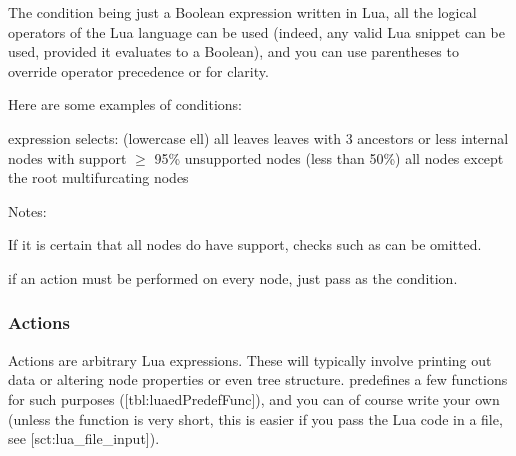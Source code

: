 The condition being just a Boolean expression written in Lua, all the logical
operators of the Lua language can be used (indeed, any valid Lua snippet can be
used, provided it evaluates to a Boolean), and you can use parentheses to
override operator precedence or for clarity.

Here are some examples of \luaed{} conditions:

\starttabulate[|c|l|]
	\NC expression \NC selects: \NC\NR
	\HL
	\NC {} (lowercase ell) \NC all leaves \NC\NR
	\NC {} \NC leaves with 3 ancestors or less \NC\NR
	\NC {} \NC internal nodes with support $\geq$ 95\% \NC\NR 
	\NC {} \NC unsupported nodes (less than 50\%) \NC\NR
	\NC {} \NC all nodes except the root \NC\NR
	\NC {} \NC multifurcating nodes \NC\NR
\stoptabulate

Notes:
\startitemize
	\item If it is certain that all nodes do have support, checks such as  can be omitted. 
	\item if an action must be performed on every node, just pass  as
	the condition.
\stopitemize

\subsubsection{Actions}

Actions are arbitrary Lua expressions. These will typically involve printing out
data or altering node properties or even tree structure. \luaed{} predefines a
few functions for such purposes ([tbl:luaedPredefFunc]), and you can
of course write your own (unless the function is very short, this is easier if
you pass the Lua code in a file, see \in{}[sct:lua_file_input]).


